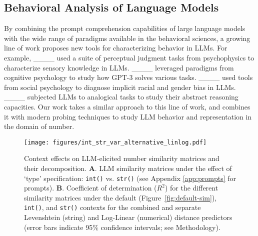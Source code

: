




\subsection{Behavioral Analysis of Language Models}
By combining the prompt comprehension capabilities of large language models with the wide range of paradigms available in the behavioral sciences, a growing line of work proposes new tools for characterizing behavior in LLMs. For example, ____ used a suite of perceptual judgment tasks from psychophysics to characterize sensory knowledge in LLMs. ____ leveraged paradigms from cognitive psychology to study how GPT-3 solves various tasks. ____ used tools from social psychology to diagnose implicit racial and gender bias in LLMs. ____ subjected LLMs to analogical tasks to study their abstract reasoning capacities. Our work takes a similar approach to this line of work, and combines it with modern probing techniques to study LLM behavior and representation in the domain of number.

\begin{figure*}[ht]
    \centering
    \texttt{[image: figures/int\_str\_var\_alternative\_linlog.pdf]}
    \caption{Context effects on LLM-elicited number similarity matrices and their decomposition. \textbf{A}. LLM similarity matrices under the effect of `type' specification: \texttt{int()} vs. \texttt{str()} (see Appendix \ref{app:prompts} for prompts). \textbf{B}. Coefficient of determination ($R^2$) for the different similarity matrices under the default (Figure~\ref{fig:default-sim}), \texttt{int()}, and \texttt{str()} contexts for the combined and separate Levenshtein (string) and Log-Linear (numerical) distance predictors (error bars indicate 95\% confidence intervals; see Methodology).}
    \label{fig:int-str-sim}
\end{figure*}